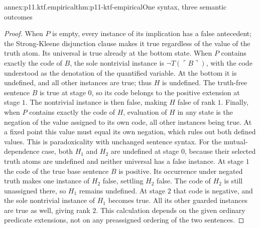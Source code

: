\begin{annexitem}{annex:p11.ktf.empirical}{thm:p11-ktf-empirical}{One syntax, three semantic outcomes}
\begin{proof}
When \(P\) is empty, every instance of its implication has a false
antecedent; the Strong-Kleene disjunction clause makes it true regardless
of the value of the truth atom. Its universal is true already at the
bottom state. When \(P\) contains exactly the code of \(B\),
the sole nontrivial instance is \(\neg T(\ulcorner B\urcorner)\),
with the code understood as the denotation of the quantified variable.
At the bottom it is undefined, and all other instances are true; thus
\(H\) is undefined. The truth-free sentence \(B\) is true at
stage \(0\), so its code belongs to the positive extension at
stage \(1\). The nontrivial instance is then false, making \(H\)
false of rank \(1\). Finally, when \(P\) contains exactly the
code of \(H\), evaluation of \(H\) in any state is the negation
of the value assigned to its own code, all other instances being true.
At a fixed point this value must equal its own negation, which rules out
both defined values. This is paradoxicality with unchanged sentence syntax.
For the mutual-dependence case, both \(H_1\) and \(H_2\) are
undefined at stage \(0\), because their selected truth atoms are
undefined and neither universal has a false instance. At stage \(1\)
the code of the true base sentence \(B\) is positive. Its occurrence
under negated truth makes one instance of \(H_2\) false, settling
\(H_2\) false. The code of \(H_2\) is still unassigned there,
so \(H_1\) remains undefined. At stage \(2\) that code is negative,
and the sole nontrivial instance of \(H_1\) becomes true. All its
other guarded instances are true as well, giving rank \(2\). This
calculation depends on the given ordinary predicate extensions, not on
any preassigned ordering of the two sentences.
\end{proof}
\end{annexitem}

